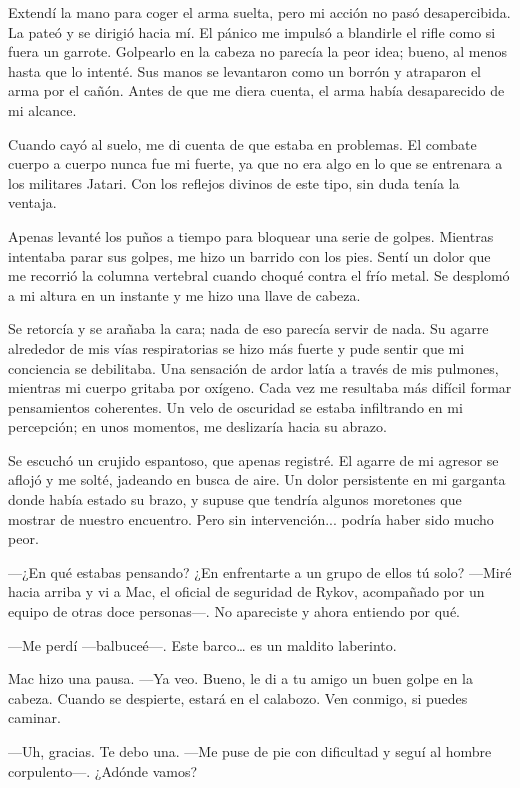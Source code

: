 Extendí la mano para coger el arma suelta, pero mi acción no pasó desapercibida. La pateó y se dirigió hacia mí. El pánico me impulsó a blandirle el rifle como si fuera un garrote. Golpearlo en la cabeza no parecía la peor idea; bueno, al menos hasta que lo intenté. Sus manos se levantaron como un borrón y atraparon el arma por el cañón. Antes de que me diera cuenta, el arma había desaparecido de mi alcance.

Cuando cayó al suelo, me di cuenta de que estaba en problemas. El combate cuerpo a cuerpo nunca fue mi fuerte, ya que no era algo en lo que se entrenara a los militares Jatari. Con los reflejos divinos de este tipo, sin duda tenía la ventaja.

Apenas levanté los puños a tiempo para bloquear una serie de golpes. Mientras intentaba parar sus golpes, me hizo un barrido con los pies. Sentí un dolor que me recorrió la columna vertebral cuando choqué contra el frío metal. Se desplomó a mi altura en un instante y me hizo una llave de cabeza.

Se retorcía y se arañaba la cara; nada de eso parecía servir de nada. Su agarre alrededor de mis vías respiratorias se hizo más fuerte y pude sentir que mi conciencia se debilitaba. Una sensación de ardor latía a través de mis pulmones, mientras mi cuerpo gritaba por oxígeno. Cada vez me resultaba más difícil formar pensamientos coherentes. Un velo de oscuridad se estaba infiltrando en mi percepción; en unos momentos, me deslizaría hacia su abrazo.

Se escuchó un crujido espantoso, que apenas registré. El agarre de mi agresor se aflojó y me solté, jadeando en busca de aire. Un dolor persistente en mi garganta donde había estado su brazo, y supuse que tendría algunos moretones que mostrar de nuestro encuentro. Pero sin intervención... podría haber sido mucho peor.

—¿En qué estabas pensando? ¿En enfrentarte a un grupo de ellos tú solo? —Miré hacia arriba y vi a Mac, el oficial de seguridad de Rykov, acompañado por un equipo de otras doce personas—. No apareciste y ahora entiendo por qué.

—Me perdí —balbuceé—. Este barco… es un maldito laberinto.

Mac hizo una pausa. —Ya veo. Bueno, le di a tu amigo un buen golpe en la cabeza. Cuando se despierte, estará en el calabozo. Ven conmigo, si puedes caminar.

—Uh, gracias. Te debo una. —Me puse de pie con dificultad y seguí al hombre corpulento—. ¿Adónde vamos?

